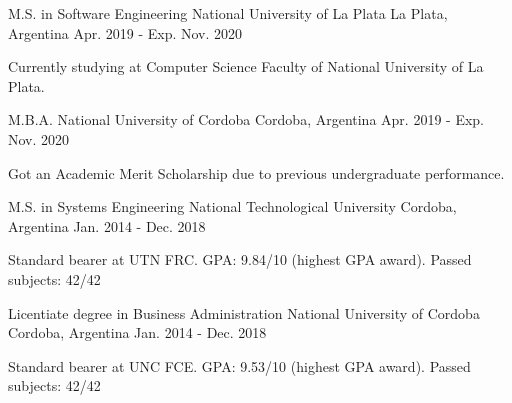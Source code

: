 

\begin{cventries}

  \cventry
    {M.S. in Software Engineering} %
    {National University of La Plata} %
    {La Plata, Argentina} %
    {Apr. 2019 - Exp. Nov. 2020} %
    {
      \begin{cvitems} %
        \item {Currently studying at Computer Science Faculty of National University of La Plata.}
      \end{cvitems}
    }

  \cventry
    {M.B.A.} %
    {National University of Cordoba} %
    {Cordoba, Argentina} %
    {Apr. 2019 - Exp. Nov. 2020} %
    {
      \begin{cvitems} %
        \item {Got an Academic Merit Scholarship due to previous undergraduate performance.}
      \end{cvitems}
    }

  \cventry
    {M.S. in Systems Engineering} %
    {National Technological University} %
    {Cordoba, Argentina} %
    {Jan. 2014 - Dec. 2018} %
    {
      \begin{cvitems} %
        \item {Standard bearer at UTN FRC. GPA: 9.84/10 (highest GPA award). Passed subjects: 42/42}
      \end{cvitems}
    }

  \cventry
    {Licentiate degree in Business Administration} %
    {National University of Cordoba} %
    {Cordoba, Argentina} %
    {Jan. 2014 - Dec. 2018} %
    {
      \begin{cvitems} %
        \item {Standard bearer at UNC FCE. GPA: 9.53/10 (highest GPA award). Passed subjects: 42/42}
      \end{cvitems}
    }

\end{cventries}
